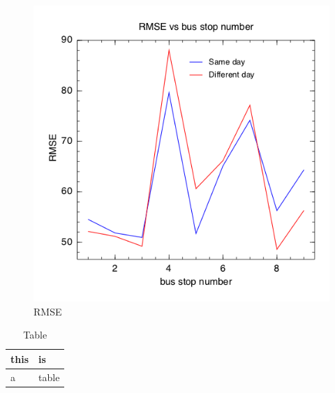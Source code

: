 \begin{figure}
\includegraphics[width=\linewidth]{images/RMSEs.png}
\caption{RMSE}
\label{rmse}
\end{figure}
\clearpage
\newpage

\begin{table}
\caption{Table}
\label{mytable}
\begin{center}
\begin{tabular}{|l|l|}\hline
this & is \\\hline
a & table \\\hline
\end{tabular}
\end{center}
\end{table}

\clearpage
\newpage
